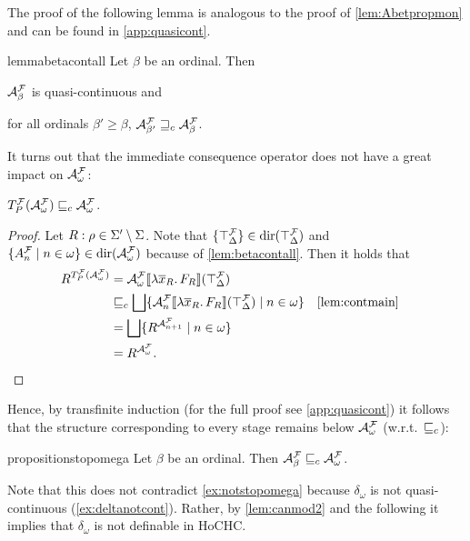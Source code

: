 \documentclass[a4paper,twoside,notitlepage,openright,11pt]{report}
\begin{document}
The proof of the following lemma is analogous to the proof of \cref{lem:Abetpropmon} and can be found in \cref{app:quasicont}.
\begin{restatable}{lemma}{betacontall}
  \label{lem:betacontall}
  Let $\beta$ be an ordinal. Then
  \begin{thmlist}
  \item\label{lem:betacont} $\mathcal A^\mathcal F_\beta$ is quasi-continuous and
  \item\label{lem:betacontinc} for all ordinals $\beta'\geq\beta$, $\mathcal A^\mathcal F_{\beta'}\sqsupseteq_c\mathcal A^\mathcal F_\beta$.
  \end{thmlist}
\end{restatable}
It turns out that the immediate consequence operator does not have a great impact on $\mathcal A_\omega^\mathcal F$:
\begin{lemma}
  \label{lem:betaomega}
  $T^\mathcal F_P(\mathcal A^\mathcal F_\omega)\sqsubseteq_c\mathcal A^\mathcal F_\omega$.
\end{lemma}
\begin{proof}
  Let $R:\rho\in\Sigma'\setminus\Sigma$. Note that $\{\top_\Delta^\mathcal F\}\in\operatorname{dir}(\top_\Delta^\mathcal F)$ and $\{A^\mathcal F_n\mid n\in\omega\}\in\operatorname{dir}(\mathcal A^\mathcal F_\omega)$ because of \cref{lem:betacontall}. Then it holds that
  \begin{align*}
    R^{T^\Hf_P(\As^\Hf_\omega)}&=\sinti{\As^\Hf_\omega}{\lambda\overline x_R\ldotp F_R}(\top_\Delta^\Hf)\\
                               &\crel\bigsqcup\{\sinti{\As^\Hf_n}{\lambda\overline x_R\ldotp F_R}(\top_\Delta^\Hf)\mid n\in\omega\}&\text{\cref{lem:contmain}}\\
                               &=\bigsqcup\{R^{\As^\Hf_{n+1}}\mid n\in\omega\}\\
                               &=R^{\As^\Hf_\omega}.&&\qedhere
  \end{align*}
\end{proof}

Hence, by transfinite induction (for the full proof see \cref{app:quasicont}) it follows that the structure corresponding to every stage remains below $\mathcal A^\mathcal F_\omega$ (w.r.t.\ $\sqsubseteq_c$):
\begin{restatable}{proposition}{stopomega}
  \label{lem:stopomega}
  Let $\beta$ be an ordinal. Then $\mathcal A^\mathcal F_\beta\sqsubseteq_c\mathcal A^\mathcal F_\omega$.
\end{restatable}

Note that this does not contradict \cref{ex:notstopomega} because $\delta_\omega$ is not quasi-continuous (\cref{ex:deltanotcont}). Rather, by \cref{lem:canmod2} and the following it implies that $\delta_\omega$ is not definable in HoCHC.
\end{document}
